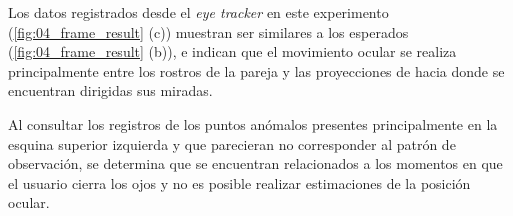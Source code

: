 \documentclass[\main/Main.tex]{subfiles}
\begin{document}
        Los datos registrados desde el \textit{eye tracker} en este experimento (\ref{fig:04_frame_result} (c)) muestran ser similares a los esperados (\ref{fig:04_frame_result} (b)), e indican que el movimiento ocular se realiza principalmente entre los rostros de la pareja y las proyecciones de hacia donde se encuentran dirigidas sus miradas. 

        Al consultar los registros de los puntos anómalos presentes principalmente en la esquina superior izquierda y que parecieran no corresponder al patrón de observación, se determina que se encuentran relacionados a los momentos en que el usuario cierra los ojos y no es posible realizar estimaciones de la posición ocular.    
\end{document}
